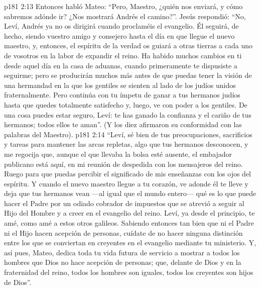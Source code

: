 \vs p181 2:13 Entonces habló Mateo: “Pero, Maestro, ¿quién nos enviará, y cómo sabremos adónde ir? ¿Nos mostrará Andrés el camino?”. Jesús respondió: “No, Leví, Andrés ya no os dirigirá cuando proclaméis el evangelio. Él seguirá, de hecho, siendo vuestro amigo y consejero hasta el día en que llegue el nuevo maestro, y, entonces, el espíritu de la verdad os guiará a otras tierras a cada uno de vosotros en la labor de expandir el reino. Ha habido muchos cambios en ti desde aquel día en la casa de aduanas, cuando primeramente te dispusiste a seguirme; pero se producirán muchos más antes de que puedas tener la visión de una hermandad en la que los gentiles se sienten al lado de los judíos unidos fraternalmente. Pero continúa con tu ímpetu de ganar a tus hermanos judíos hasta que quedes totalmente satisfecho y, luego, ve con poder a los gentiles. De una cosa puedes estar seguro, Leví: te has ganado la confianza y el cariño de tus hermanos; todos ellos te aman”. (Y los diez afirmaron su conformidad con las palabras del Maestro).
\vs p181 2:14 “Leví, sé bien de tus preocupaciones, sacrificios y tareas para mantener las arcas repletas, algo que tus hermanos desconocen, y me regocija que, aunque el que llevaba la bolsa esté ausente, el embajador publicano está aquí, en mi reunión de despedida con los mensajeros del reino. Ruego para que puedas percibir el significado de mis enseñanzas con los ojos del espíritu. Y cuando el nuevo maestro llegue a tu corazón, ve adonde él te lleve y deja que tus hermanos vean ---al igual que el mundo entero--- qué es lo que puede hacer el Padre por un odiado cobrador de impuestos que se atrevió a seguir al Hijo del Hombre y a creer en el evangelio del reino. Leví, ya desde el principio, te amé, como amé a estos otros galileos. Sabiendo entonces tan bien que ni el Padre ni el Hijo hacen acepción de personas, cuídate de no hacer ninguna distinción entre los que se conviertan en creyentes en el evangelio mediante tu ministerio. Y, así pues, Mateo, dedica toda tu vida futura de servicio a mostrar a todos los hombres que Dios no hace acepción de personas; que, delante de Dios y en la fraternidad del reino, todos los hombres son iguales, todos los creyentes son hijos de Dios”.
